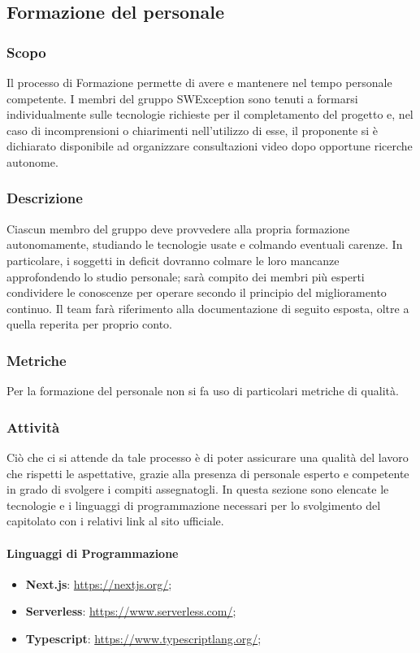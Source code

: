 \subsection{Formazione del personale}
\subsubsection{Scopo}
Il processo di Formazione permette di avere e mantenere nel tempo personale competente. I membri del gruppo SWException sono tenuti a formarsi individualmente sulle tecnologie richieste per il completamento del progetto e, nel caso di incomprensioni o chiarimenti nell'utilizzo di esse, il proponente si è dichiarato disponibile ad organizzare consultazioni video dopo opportune ricerche autonome.
\subsubsection{Descrizione}
Ciascun membro del gruppo deve provvedere alla propria formazione autonomamente,
studiando le tecnologie usate e colmando eventuali carenze. In particolare, i soggetti in
deficit dovranno colmare le loro mancanze approfondendo lo studio personale; sarà compito
dei membri più esperti condividere le conoscenze per operare secondo il principio del miglioramento continuo.
Il team farà riferimento alla documentazione di seguito esposta, oltre a quella reperita per
proprio conto.

\subsubsection{Metriche}
Per la formazione del personale non si fa uso di particolari metriche di qualità.

\subsubsection{Attività}
Ciò che ci si attende da tale processo è di poter assicurare una qualità del lavoro che
rispetti le aspettative, grazie alla presenza di personale esperto e competente in grado di
svolgere i compiti assegnatogli. In questa sezione sono elencate le tecnologie e i linguaggi di programmazione necessari per lo svolgimento del capitolato con i relativi link al sito ufficiale.

\paragraph{Linguaggi di Programmazione}
\begin{itemize}
    \item \textbf{Next.js}: \url{https://nextjs.org/};
    \item \textbf{Serverless}: \url{https://www.serverless.com/};
    \item \textbf{Typescript}: \url{https://www.typescriptlang.org/};
\end{itemize}
